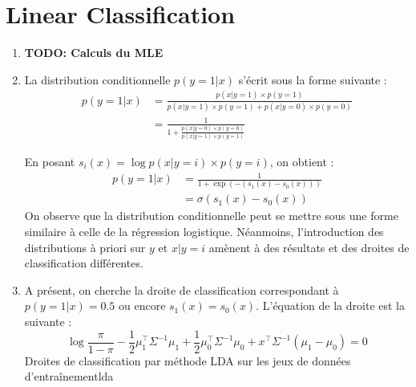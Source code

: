 \documentclass{article}
\begin{document}
\section{Linear Classification}


\begin{enumerate}[label=(\alph*)]
\item \textbf{TODO: Calculs du MLE}

\item La distribution conditionnelle $p(y=1|x)$ s'écrit sous la forme suivante :
\begin{align*}
p(y=1|x) &= \frac{p(x|y=1)\times p(y=1)}{p(x|y=1)\times p(y=1) + p(x|y=0)\times p(y=0)}\\
&= \frac{1}{1 + \frac{p(x|y=0)\times p(y=0)}{p(x|y=1)\times p(y=1)}}
\end{align*}

En posant $s_i(x) = \log p(x|y=i)\times p(y=i)$, on obtient :
\begin{align*}
p(y=1|x) &= \frac{1}{1 + \exp(-(s_1(x)-s_0(x)))}\\
&= \sigma(s_1(x)-s_0(x))
\end{align*}
On observe que la distribution conditionnelle peut se mettre sous une forme similaire à celle de la régression logistique. Néanmoins, l'introduction des distributions à priori sur $y$ et $x|y=i$ amènent à des résultats et des droites de classification différentes.

\item A présent, on cherche la droite de classification correspondant à $p(y=1|x) = 0.5$ ou encore $s_1(x) = s_0(x)$. L'équation de la droite est la suivante :
$$
\log\frac{\pi}{1-\pi} - \frac{1}{2}\mu_1^\intercal \Sigma^{-1} \mu_1 + \frac{1}{2}\mu_0^\intercal \Sigma^{-1}\mu_0 + x^\intercal \Sigma^{-1}(\mu_1 - \mu_0) = 0
$$
          {}
          {}
          {Droites de classification par méthode LDA sur les jeux de données d'entraînement}{lda}
\end{enumerate}

\end{document}
